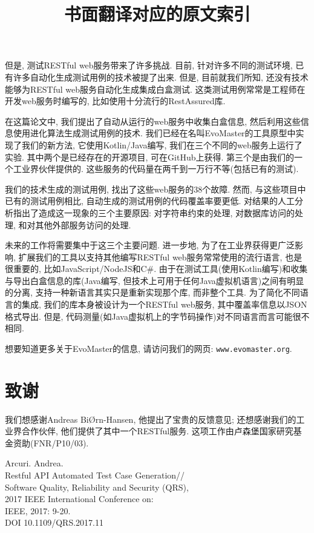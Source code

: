     但是, 测试RESTful web服务带来了许多挑战. 目前, 针对许多不同的测试环境, 已有许多自动化生成测试用例的技术被提了出来. 但是, 目前就我们所知, 还没有技术能够为RESTful web服务自动化生成集成白盒测试. 这类测试用例常常是工程师在开发web服务时编写的, 比如使用十分流行的RestAssured库. 
    
    在这篇论文中, 我们提出了自动从运行的web服务中收集白盒信息, 然后利用这些信息使用进化算法生成测试用例的技术. 我们已经在名叫EvoMaster的工具原型中实现了我们的新方法, 它使用Kotlin/Java编写, 我们在三个不同的web服务上运行了实验. 其中两个是已经存在的开源项目, 可在GitHub上获得. 第三个是由我们的一个工业界伙伴提供的. 这些服务的代码量在两千到一万行不等(包括已有的测试). 
    
    我们的技术生成的测试用例, 找出了这些web服务的38个故障. 然而, 与这些项目中已有的测试用例相比, 自动生成的测试用例的代码覆盖率要更低. 对结果的人工分析指出了造成这一现象的三个主要原因: 对字符串约束的处理, 对数据库访问的处理, 和对其他外部服务访问的处理. 
    
    未来的工作将需要集中于这三个主要问题. 进一步地, 为了在工业界获得更广泛影响, 扩展我们的工具以支持其他编写RESTful web服务常常使用的流行语言, 也是很重要的, 比如JavaScript/NodeJS和C\#. 由于在测试工具(使用Kotlin编写)和收集与导出白盒信息的库(Java编写, 但技术上可用于任何Java虚拟机语言)之间有明显的分离, 支持一种新语言其实只是重新实现那个库, 而非整个工具. 为了简化不同语言的集成, 我们的库本身被设计为一个RESTful web服务, 其中覆盖率信息以JSON格式导出. 但是, 代码测量(如Java虚拟机上的字节码操作)对不同语言而言可能很不相同.
    
    想要知道更多关于EvoMaster的信息, 请访问我们的网页: \texttt{www.evomaster.org}. 

\section*{致谢}
  我们想感谢Andreas BiØrn-Hansen, 他提出了宝贵的反馈意见; 还想感谢我们的工业界合作伙伴, 他们提供了其中一个RESTful服务. 这项工作由卢森堡国家研究基金资助(FNR/P10/03). 

\title{书面翻译对应的原文索引}

  \begin{flushleft}
    Arcuri. Andrea. \\
    Restful API Automated Test Case Generation\allowbreak[C]// \\
    \allowbreak{}Software Quality, Reliability and Security (QRS),\\
    2017 IEEE International Conference on:\\
    IEEE, 2017: 9-20. \\
    DOI 10.1109/QRS.2017.11
  \end{flushleft}


